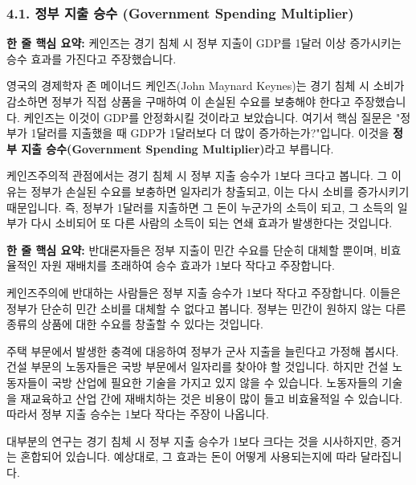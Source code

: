 \documentclass[11pt,a4paper]{book}
\theoremstyle{definition}
\begin{document}
\subsubsection*{4.1. 정부 지출 승수 (Government Spending Multiplier)}

\begin{tcolorbox}[mybox={케인즈주의적 관점}]
    \textbf{한 줄 핵심 요약:} 케인즈는 경기 침체 시 정부 지출이 GDP를 1달러 이상 증가시키는 승수 효과를 가진다고 주장했습니다.
\end{tcolorbox}

영국의 경제학자 존 메이너드 케인즈(John Maynard Keynes)는 경기 침체 시 소비가 감소하면 정부가 직접 상품을 구매하여 이 손실된 수요를 보충해야 한다고 주장했습니다. 케인즈는 이것이 GDP를 안정화시킬 것이라고 보았습니다. 여기서 핵심 질문은 "정부가 1달러를 지출했을 때 GDP가 1달러보다 더 많이 증가하는가?"입니다. 이것을 \textbf{정부 지출 승수(Government Spending Multiplier)}라고 부릅니다.

케인즈주의적 관점에서는 경기 침체 시 정부 지출 승수가 1보다 크다고 봅니다. 그 이유는 정부가 손실된 수요를 보충하면 일자리가 창출되고, 이는 다시 소비를 증가시키기 때문입니다. 즉, 정부가 1달러를 지출하면 그 돈이 누군가의 소득이 되고, 그 소득의 일부가 다시 소비되어 또 다른 사람의 소득이 되는 연쇄 효과가 발생한다는 것입니다.

\begin{tcolorbox}[mybox={케인즈주의 반대 관점}]
    \textbf{한 줄 핵심 요약:} 반대론자들은 정부 지출이 민간 수요를 단순히 대체할 뿐이며, 비효율적인 자원 재배치를 초래하여 승수 효과가 1보다 작다고 주장합니다.
\end{tcolorbox}

케인즈주의에 반대하는 사람들은 정부 지출 승수가 1보다 작다고 주장합니다. 이들은 정부가 단순히 민간 소비를 대체할 수 없다고 봅니다. 정부는 민간이 원하지 않는 다른 종류의 상품에 대한 수요를 창출할 수 있다는 것입니다.

\begin{examplebox}[title={예시: 비효율적인 자원 재배치}]
    주택 부문에서 발생한 충격에 대응하여 정부가 군사 지출을 늘린다고 가정해 봅시다. 건설 부문의 노동자들은 국방 부문에서 일자리를 찾아야 할 것입니다. 하지만 건설 노동자들이 국방 산업에 필요한 기술을 가지고 있지 않을 수 있습니다. 노동자들의 기술을 재교육하고 산업 간에 재배치하는 것은 비용이 많이 들고 비효율적일 수 있습니다. 따라서 정부 지출 승수는 1보다 작다는 주장이 나옵니다.
\end{examplebox}

\begin{summarybox}[title={정부 지출 승수에 대한 증거}]
    대부분의 연구는 경기 침체 시 정부 지출 승수가 1보다 크다는 것을 시사하지만, 증거는 혼합되어 있습니다. 예상대로, 그 효과는 돈이 어떻게 사용되는지에 따라 달라집니다.
\end{summarybox}
\end{document}
